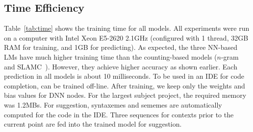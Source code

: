 \subsection{Time Efficiency}



Table~\ref{tab:time} shows the training time for all models.  All
experiments were run on a computer with Intel Xeon E5-2620 2.1GHz
(configured with 1 thread, 32GB RAM for training, and 1GB for
predicting). As expected, the three NN-based LMs have much higher
training time than the counting-based models ($n$-gram and
SLAMC~\cite{fse13}). However, they achieve higher accuracy as
shown earlier. Each prediction in all models is about 10
milliseconds.
%
To be used in an IDE for code completion, {\tool} can be trained
off-line. After training, we keep only the weights and bias values for
DNN nodes. For the largest subject project, the required memory was
1.2MBs. For suggestion, syntaxemes and sememes are automatically
computed for the code in the IDE. Three sequences for contexts prior
to the current point are fed into the trained model for suggestion.




